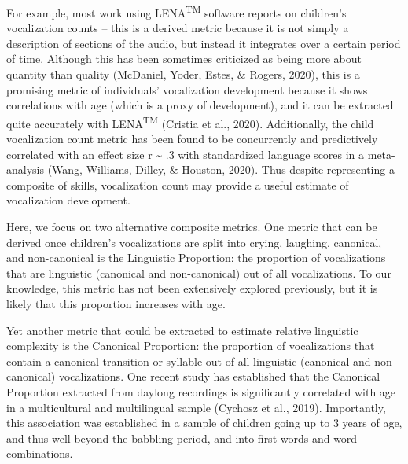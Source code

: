 \documentclass[english,,man]{apa6}
\begin{document}
For example, most work using LENA\textsuperscript{TM} software reports on children's vocalization counts -- this is a derived metric because it is not simply a description of sections of the audio, but instead it integrates over a certain period of time. Although this has been sometimes criticized as being more about quantity than quality (McDaniel, Yoder, Estes, \& Rogers, 2020), this is a promising metric of individuals' vocalization development because it shows correlations with age (which is a proxy of development), and it can be extracted quite accurately with LENA\textsuperscript{TM} (Cristia et al., 2020). Additionally, the child vocalization count metric has been found to be concurrently and predictively correlated with an effect size r \textasciitilde{} .3 with standardized language scores in a meta-analysis (Wang, Williams, Dilley, \& Houston, 2020). Thus despite representing a composite of skills, vocalization count may provide a useful estimate of vocalization development.

Here, we focus on two alternative composite metrics. One metric that can be derived once children's vocalizations are split into crying, laughing, canonical, and non-canonical is the Linguistic Proportion: the proportion of vocalizations that are linguistic (canonical and non-canonical) out of all vocalizations. To our knowledge, this metric has not been extensively explored previously, but it is likely that this proportion increases with age.

Yet another metric that could be extracted to estimate relative linguistic complexity is the Canonical Proportion: the proportion of vocalizations that contain a canonical transition or syllable out of all linguistic (canonical and non-canonical) vocalizations. One recent study has established that the Canonical Proportion extracted from daylong recordings is significantly correlated with age in a multicultural and multilingual sample (Cychosz et al., 2019). Importantly, this association was established in a sample of children going up to 3 years of age, and thus well beyond the babbling period, and into first words and word combinations.
\end{document}
